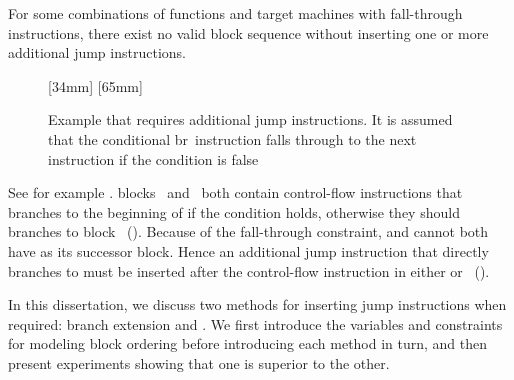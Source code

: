 For some combinations of \glspl{function} and \glspl{target machine} with
\gls{fall-through} \glspl{instruction}, there exist no valid \gls{block}
sequence without inserting one or more additional jump \glspl{instruction}.
%
\begin{figure}
  \setlength{\opNodeDist}{20pt}%

  \mbox{}%
  \hfill%
                [34mm]%
                {%
                }%
  \hfill%
                [65mm]%
                {%
                  \hspace{6mm}%
                }%
  \hfill%
  \mbox{}

  \caption[Example that requires additional jump instructions]%
          {%
            Example that requires additional jump instructions.
            It is assumed that the conditional {\instrFont br}~instruction
            falls through to the next instruction if the condition is false%
          }
\end{figure}
%
See for example .
%
\Glspl{block}~ and~ both contain control-flow
\glspl{instruction} that branches to the beginning of  if the
condition holds, otherwise they should branches to block~
().
%
Because of the fall-through \gls{constraint},  and  cannot
both have  as its successor \gls{block}.
%
Hence an additional jump \gls{instruction} that directly branches to 
must be inserted after the control-flow \gls{instruction} in either 
or~ ().

In this dissertation, we discuss two methods for inserting jump
\glspl{instruction} when required: \gls{branch extension} and .
%
We first introduce the \glspl{variable} and \glspl{constraint} for modeling
\gls{block ordering} before introducing each method in turn, and then present
experiments showing that one is superior to the other.



